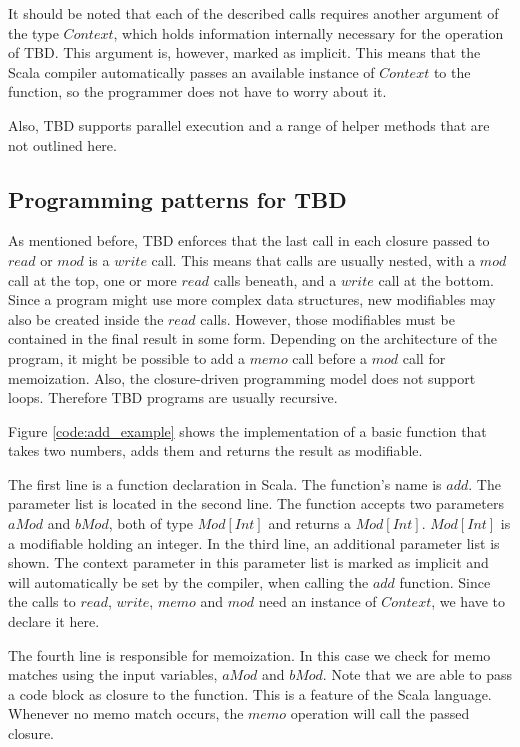 It should be noted that each of the described calls requires another argument of the type $Context$, which holds information internally necessary for the operation of TBD. This argument is, however, marked as implicit. This means that the Scala compiler automatically passes an available instance of $Context$ to the function, so the programmer does not have to worry about it.  

Also, TBD supports parallel execution and a range of helper methods that are not outlined here. 

\subsection{Programming patterns for TBD}

As mentioned before, TBD enforces that the last call in each closure passed to $read$ or $mod$ is a $write$ call. This means that calls are usually nested, with a $mod$ call at the top, one or more $read$ calls beneath, and a $write$ call at the bottom. Since a program might use more complex data structures, new modifiables may also be created inside the $read$ calls. However, those modifiables must be contained in the final result in some form. Depending on the architecture of the program, it might be possible to add a $memo$ call before a $mod$ call for memoization. Also, the closure-driven programming model does not support loops. Therefore TBD programs are usually recursive. 

Figure \ref{code:add_example} shows the implementation of a basic function that takes two numbers, adds them and returns the result as modifiable. 

The first line is a function declaration in Scala. The function's name is $add$. The parameter list is located in the second line. The function accepts two parameters $aMod$ and $bMod$, both of type $Mod[Int]$ and returns a $Mod[Int]$. $Mod[Int]$ is a modifiable holding an integer. In the third line, an additional parameter list is shown. The context parameter in this parameter list is marked as implicit and will automatically be set by the compiler, when calling the $add$ function. Since the calls to $read$, $write$, $memo$ and $mod$ need an instance of $Context$, we have to declare it here. 

The fourth line is responsible for memoization. In this case we check for memo matches using the input variables, $aMod$ and $bMod$. Note that we are able to pass a code block as closure to the function. This is a feature of the Scala language. Whenever no memo match occurs, the $memo$ operation will call the passed closure. 

